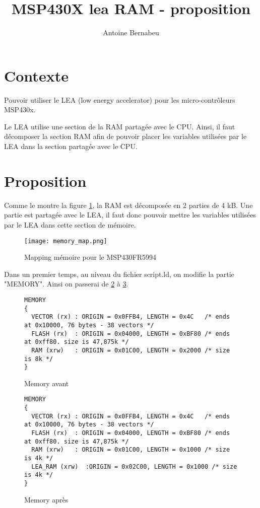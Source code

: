 \documentclass[11pt, oneside]{article}
\title{MSP430X lea RAM - proposition}
\author{Antoine Bernabeu}
\begin{document}
\maketitle

\section{Contexte}
Pouvoir utiliser le LEA (low energy accelerator) pour les micro-contrôleurs MSP430x.

Le LEA utilise une section de la RAM partagée avec le CPU. Ainsi, il faut décomposer la section RAM afin de pouvoir placer les variables utilisées par le LEA dans la section partagée avec le CPU.

\section{Proposition}

Comme le montre la figure \ref{memory_map}, la RAM est décomposée en 2 parties de 4 kB. Une partie est partagée avec le LEA, il faut donc pouvoir mettre les variables utilisées par le LEA dans cette section de mémoire.
\begin{figure}
\caption{Mapping mémoire pour le MSP430FR5994}
\texttt{[image: memory\_map.png]}
\label{memory_map}
\end{figure}

Dans un premier temps, au niveau du fichier script.ld, on modifie la partie "MEMORY". Ainsi on passerai de \ref{mem_avant} à \ref{mem_apres}.

\begin{figure}
\caption{Memory avant}
\begin{lstlisting}
MEMORY
{
  VECTOR (rx) : ORIGIN = 0x0FFB4, LENGTH = 0x4C   /* ends at 0x10000, 76 bytes - 38 vectors */
  FLASH (rx)  : ORIGIN = 0x04000, LENGTH = 0xBF80 /* ends at 0xff80. size is 47,875k */
  RAM (xrw)   : ORIGIN = 0x01C00, LENGTH = 0x2000 /* size is 8k */
}
\end{lstlisting}
\label{mem_avant}
\end{figure}

\begin{figure}
\caption{Memory après}
\begin{lstlisting}
MEMORY
{
  VECTOR (rx) : ORIGIN = 0x0FFB4, LENGTH = 0x4C   /* ends at 0x10000, 76 bytes - 38 vectors */
  FLASH (rx)  : ORIGIN = 0x04000, LENGTH = 0xBF80 /* ends at 0xff80. size is 47,875k */
  RAM (xrw)   : ORIGIN = 0x01C00, LENGTH = 0x1000 /* size is 4k */
  LEA_RAM (xrw)  :ORIGIN = 0x02C00, LENGTH = 0x1000 /* size is 4k */
}
\end{lstlisting}
\label{mem_apres}
\end{figure}
\end{document}
